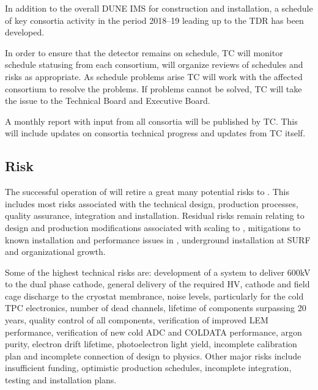 In addition to the overall DUNE IMS for construction and
installation, a schedule of key consortia activity in the period
2018--19 leading up to the TDR has been developed.

In order to ensure that the  detector remains on schedule,
TC will monitor schedule statusing from each consortium, will organize
reviews of schedules and risks as appropriate.  As schedule problems
arise TC will work with the affected consortium to resolve the
problems. If problems cannot be solved, TC will take the issue to the
Technical Board and Executive Board.

A monthly report with input from all consortia will be published by
TC. This will include updates on consortia technical progress and
updates from TC itself.


\subsection{Risk}
\label{sec:fdsp-coord-risk}

The successful operation of  will retire a great many
potential risks to . This includes most risks associated with the
technical design, production processes, quality assurance, integration
and installation. Residual risks remain relating to design and
production modifications associated with scaling to , mitigations
to known installation and performance issues in , underground
installation at SURF and organizational growth.

Some of the highest technical risks are: development of a system to
deliver 600kV to the dual phase cathode, general delivery of the
required HV, cathode and field cage discharge to the cryostat
membrance, noise levels, particularly for the cold TPC electronics,
number of dead channels, lifetime of components surpassing 20 years,
quality control of all components, verification of improved LEM
performance, verification of new cold ADC and COLDATA performance,
argon purity, electron drift lifetime, photoelectron light yield,
incomplete calibration plan and incomplete connection of design to
physics. Other major risks include insufficient funding, optimistic
production schedules, incomplete integration, testing and installation
plans.


